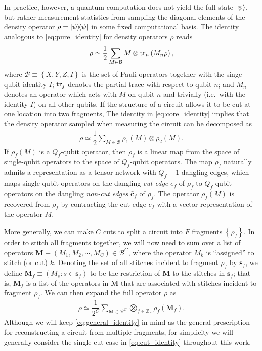 \documentclass[nofootinbib,notitlepage,11pt]{revtex4-2}
\newcommand{\f}[2]{\dfrac{#1}{#2}} %
\newcommand{\p}[1]{\left(#1\right)} %
\renewcommand{\set}[1]{\left\{#1\right\}} %
\renewcommand{\v}{\bm} %
\newcommand{\B}{\mathcal{B}}
\newcommand{\Z}{\mathbb{Z}}
\begin{document}
In practice, however, a quantum computation does not yield the full
state $\ket\psi$, but rather measurement statistics from sampling the
diagonal elements of the density operator $\rho=\op\psi$ in some fixed
computational basis.  The identity analogous to
\eqref{eq:pure_identity} for density operators $\rho$ reads
\begin{align}
  \rho \simeq \f12 \sum_{M\in\B} M \otimes \tr_n\p{M_n\rho},
  \label{eq:core_identity}
\end{align}
where $\B\equiv\set{X,Y,Z,I}$ is the set of Pauli operators together
with the singe-qubit identity $I$; $\tr_j$ denotes the partial trace
with respect to qubit $n$; and $M_n$ denotes an operator which acts
with $M$ on qubit $n$ and trivially (i.e.~with the identity $I$) on
all other qubits.  If the structure of a circuit allows it to be cut
at one location into two fragments, The identity in
\eqref{eq:core_identity} implies that the density operator sampled
when measuring the circuit can be decomposed as
\begin{align}
  \rho \simeq \f12 \sum_{M\in\B} \rho_1\p{M} \otimes \rho_2\p{M}.
  \label{eq:cut_identity}
\end{align}
If $\rho_f\p{M}$ is a $Q_f$-qubit operator, then $\rho_f$ is a linear
map from the space of single-qubit operators to the space of
$Q_f$-qubit operators.  The map $\rho_f$ naturally admits a
representation as a tensor network with $Q_f+1$ dangling edges, which
maps single-qubit operators on the dangling {\it cut edge} $e_f$ of
$\rho_f$ to $Q_f$-qubit operators on the dangling {\it non-cut edges}
$\bar{\v c}_f$ of $\rho_f$.  The operator $\rho_f\p{M}$ is recovered
from $\rho_f$ by contracting the cut edge $e_f$ with a vector
representation of the operator $M$.

More generally, we can make $C$ cuts to split a circuit into $F$
fragments $\set{\rho_f}$.  In order to stitch all fragments together,
we will now need to sum over a list of operators
$\v M\equiv\p{M_1,M_2,\cdots,M_C}\in\B^C$, where the operator $M_k$ is
``assigned'' to stitch (or cut) $k$.  Denoting the set of all stitches
incident to fragment $\rho_f$ by $\v s_f$, we define
$\v M_f\equiv\p{M_s:s\in\v s_f}$ to be the restriction of $\v M$ to
the stitches in $\v s_f$; that is, $\v M_f$ is a list of the operators
in $\v M$ that are associated with stitches incident to fragment
$\rho_f$.  We can then expand the full operator $\rho$ as
\begin{align}
  \rho \simeq \f1{2^C} \sum_{\v M\in\B^C}
  \bigotimes_{f\in\Z_F} \rho_f\p{\v M_f}.
  \label{eq:general_identity}
\end{align}
Although we will keep \eqref{eq:general_identity} in mind as the
general prescription for reconstructing a circuit from multiple
fragments, for simplicity we will generally consider the single-cut
case in \eqref{eq:cut_identity} throughout this work.
\end{document}
